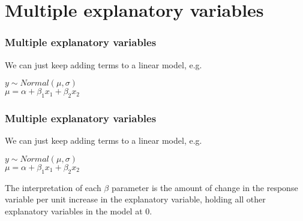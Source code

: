 \documentclass{beamer}
\begin{document}
\section{Multiple explanatory variables}
\begin{frame}
  \frametitle{Multiple explanatory variables}
  We can just keep adding terms to a linear model, e.g.\\
  \vspace{0.5cm}
  \begin{centering}
  $y \sim Normal(\mu, \sigma)$ \\  \vspace{0.5cm}
  $\mu = \alpha + \beta_1x_1 + \beta_2x_2$ \\
\end{centering}
\end{frame}
\begin{frame}
  \frametitle{Multiple explanatory variables}
  We can just keep adding terms to a linear model, e.g.\\ \vspace{0.5cm}

  \begin{centering}
  $y \sim Normal(\mu, \sigma)$ \\ \vspace{0.5cm}
  $\mu = \alpha + \beta_1x_1 + \beta_2x_2$ \\
  \end{centering} \vspace{0.5cm}

  The interpretation of each $\beta$ parameter is the amount of change in the response variable per unit increase in the explanatory variable, \alert{holding all other explanatory variables in the model at 0}.
\end{frame}
\end{document}
